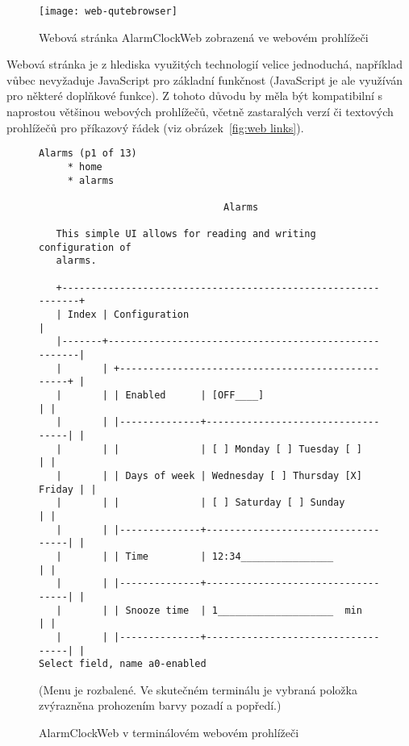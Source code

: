 \begin{figure}[htbp]
    \centering
    \texttt{[image: web-qutebrowser]}
    \caption{%
        Webová stránka AlarmClockWeb zobrazená ve webovém prohlížeči
    }
    \label{fig:web qutebrowser}
\end{figure}

Webová stránka je z hlediska využitých technologií velice jednoduchá, například
vůbec nevyžaduje JavaScript pro základní funkčnost (JavaScript je ale využíván
pro některé doplňkové funkce). Z tohoto důvodu by měla být kompatibilní
s naprostou většinou webových prohlížečů, včetně zastaralých verzí či textových
prohlížečů pro příkazový řádek (viz obrázek~\vref{fig:web links}).

\begin{figure}[htbp]
    \begin{lstlisting}[style=terminal,columns=fixed]
                                                    Alarms (p1 of 13) 
     * home                                                           
     * alarms                                                         
                                                                      
                                Alarms                                
                                                                      
   This simple UI allows for reading and writing configuration of     
   alarms.                                                            
                                                                      
   +--------------------------------------------------------------+   
   | Index | Configuration                                        |   
   |-------+------------------------------------------------------|   
   |       | +--------------------------------------------------+ |   
   |       | | Enabled      | [OFF____]                         | |   
   |       | |--------------+-----------------------------------| |   
   |       | |              | [ ] Monday [ ] Tuesday [ ]        | |   
   |       | | Days of week | Wednesday [ ] Thursday [X] Friday | |   
   |       | |              | [ ] Saturday [ ] Sunday           | |   
   |       | |--------------+-----------------------------------| |   
   |       | | Time         | 12:34________________             | |   
   |       | |--------------+-----------------------------------| |   
   |       | | Snooze time  | 1____________________  min        | |   
   |       | |--------------+-----------------------------------| |   
Select field, name a0-enabled                                        
    \end{lstlisting}
    {\footnotesize (Menu  je rozbalené. Ve skutečném terminálu je
    vybraná položka zvýrazněna prohozením barvy pozadí a popředí.)}
    \caption{AlarmClockWeb v terminálovém webovém prohlížeči }
    \label{fig:web links}
\end{figure}


